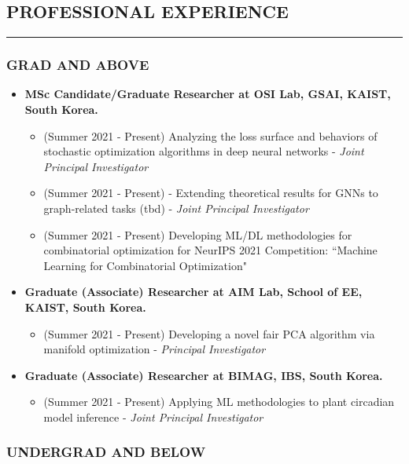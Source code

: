\documentclass[10pt,a4]{article}
\begin{document}
\begin{small}
\subsection*{PROFESSIONAL EXPERIENCE}
\hrule
\vspace{0.2cm}

\subsubsection*{GRAD AND ABOVE}

\begin{itemize}

	\item {\bf MSc Candidate/Graduate Researcher at OSI Lab, GSAI, KAIST, South Korea.}
	\begin{itemize}
		\item (Summer 2021 - Present) Analyzing the loss surface and behaviors of stochastic optimization algorithms in deep neural networks - {\it Joint Principal Investigator}
		
		\item (Summer 2021 - Present) - Extending theoretical results for GNNs to graph-related tasks (tbd) - {\it Joint Principal Investigator}
		
		\item (Summer 2021 - Present) Developing ML/DL methodologies for combinatorial optimization for NeurIPS 2021 Competition: ``Machine Learning for Combinatorial Optimization"
	\end{itemize}

	\item {\bf Graduate (Associate) Researcher at AIM Lab, School of EE, KAIST, South Korea.}
	\begin{itemize}
		\item (Summer 2021 - Present) Developing a novel fair PCA algorithm via manifold optimization - {\it Principal Investigator}
	\end{itemize}

	\item {\bf Graduate (Associate) Researcher at BIMAG, IBS, South Korea.}
	\begin{itemize}
		\item (Summer 2021 - Present) Applying ML methodologies to plant circadian model inference - {\it Joint Principal Investigator}
	\end{itemize}
\end{itemize}


\subsubsection*{UNDERGRAD AND BELOW}
\begin{itemize}
	

\end{itemize}
\end{small}
\end{document}
